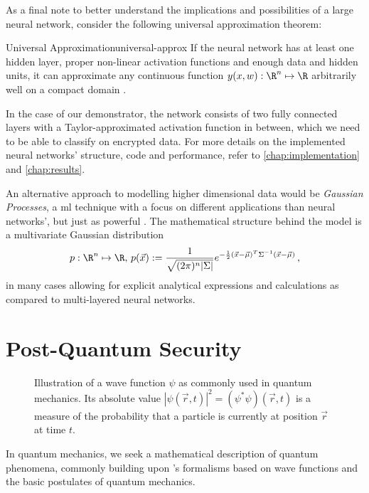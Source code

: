 As a final note to better understand the implications and possibilities of a large neural network, consider the following universal approximation theorem:

\begin{theorem}{Universal Approximation}{universal-approx}
  If the neural network has at least one hidden layer, proper non-linear activation functions and enough data and hidden units, it can approximate any continuous function $y(x, w): \R^n \mapsto \R$ arbitrarily well on a compact domain \parencite{1989-HornikMultilayerFN}.
\end{theorem}

In the case of our demonstrator, the network consists of two fully connected layers with a Taylor-approximated  activation function in between, which we need to be able to classify on encrypted data.
For more details on the implemented neural networks' structure, code and performance, refer to \cref{chap:implementation} and \cref{chap:results}.

An alternative approach to modelling higher dimensional data would be \textit{Gaussian Processes}, a \glsdesc{ml} technique with a focus on different applications than neural networks', but just as powerful \parencite[Chapter 45]{2005-mackay-information-theory}.
The mathematical structure behind the model is a multivariate Gaussian distribution
$$p: \R^n \mapsto \R,\, p(\vec{x}) := \frac{1}{\sqrt{(2\pi)^n |\Sigma|}} e^{-\frac{1}{2} (\vec{x}-\vec{\mu})^T \Sigma\inv (\vec{x}-\vec{\mu})} \,,$$
in many cases allowing for explicit analytical expressions and calculations as compared to multi-layered neural networks.

\pagebreak
\section{Post-Quantum Security}
\label{sec:post-quantum-sec}
\begin{figure}[H]
  \centering
  \caption[Illustration of a wave function]{
    Illustration of a wave function $\psi$ as commonly used in quantum mechanics.
    Its absolute value $|\psi(\vec{r}, t)|^2 = (\psi^* \psi)(\vec{r}, t)$ is a measure of the probability that a particle is currently at position $\vec{r}$ at time $t$.
  }
  \label{fig:wave-function}
\end{figure}

In quantum mechanics, we seek a mathematical description of quantum phenomena, commonly building upon 's formalisms based on wave functions and the basic postulates of quantum mechanics.


